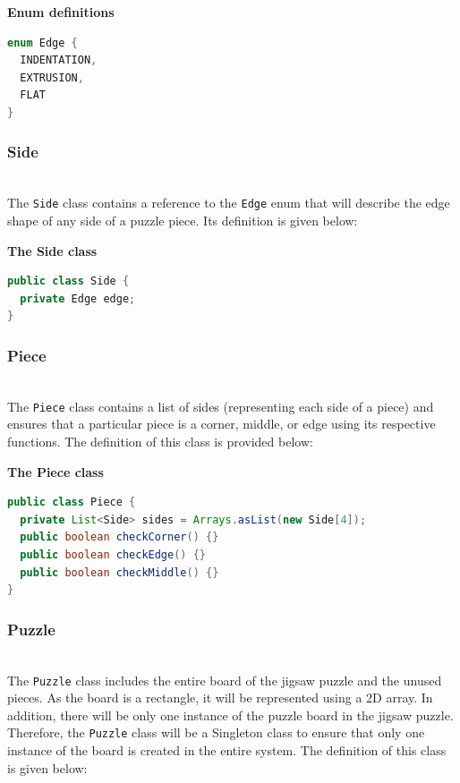 \textbf{Enum definitions}

\begin{lstlisting}[language=Java]
enum Edge {
  INDENTATION, 
  EXTRUSION, 
  FLAT
}
\end{lstlisting}

\subsubsection{Side}\label{_ahFF7YPkyYYRp-o1OVUm}
\\
The \texttt{Side} class contains a reference to the \texttt{Edge} enum that will describe the edge shape of any side of a puzzle piece. Its definition is given below:

\textbf{The Side class}

\begin{lstlisting}[language=Java]
public class Side {
  private Edge edge;
}
\end{lstlisting}

\subsubsection{Piece}\label{B6SjSJlx9bFwLHg9WYeif}
\\
The \texttt{Piece} class contains a list of sides (representing each side of a piece) and ensures that a particular piece is a corner, middle, or edge using its respective functions. The definition of this class is provided below:

\textbf{The Piece class}

\begin{lstlisting}[language=Java]
public class Piece {
  private List<Side> sides = Arrays.asList(new Side[4]);
  public boolean checkCorner() {}
  public boolean checkEdge() {}
  public boolean checkMiddle() {}
}
\end{lstlisting}

\subsubsection{Puzzle}\label{ePhNw9GWSys3S70Fvesd0}
\\
The \texttt{Puzzle} class includes the entire board of the jigsaw puzzle and the unused pieces. As the board is a rectangle, it will be represented using a 2D array. In addition, there will be only one instance of the puzzle board in the jigsaw puzzle. Therefore, the \texttt{Puzzle} class will be a Singleton class to ensure that only one instance of the board is created in the entire system. The definition of this class is given below:

